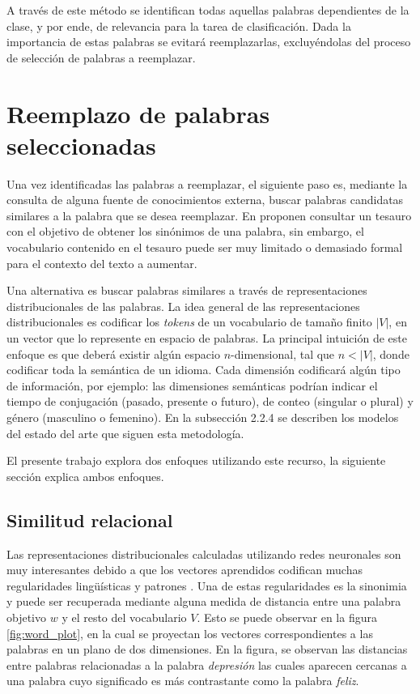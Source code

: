A través de este método se identifican todas aquellas palabras dependientes de la clase, y por ende, de relevancia para la tarea de clasificación. Dada la importancia de estas palabras se evitará reemplazarlas, excluyéndolas del proceso de selección de palabras a reemplazar.

\section{Reemplazo de palabras seleccionadas}

Una vez identificadas las palabras a reemplazar, el siguiente paso es, mediante la consulta de alguna fuente de conocimientos externa, buscar palabras candidatas similares a la palabra que se desea reemplazar. En \citep{zhang2015character} proponen consultar un tesauro con el objetivo de obtener los sinónimos de una palabra, sin embargo, el vocabulario contenido en el tesauro puede ser muy limitado o demasiado formal para el contexto del texto a aumentar. 

Una alternativa es buscar palabras similares a través de representaciones distribucionales de las palabras. La idea general de las representaciones distribucionales es codificar los \textit{tokens} de un vocabulario de tamaño finito $|V|$, en un vector que lo represente en espacio de palabras. La principal intuición de este enfoque es que deberá existir algún espacio $n$-dimensional, tal que $n<|V|$, donde codificar toda la semántica de un idioma. Cada dimensión codificará algún tipo de información, por ejemplo: las dimensiones semánticas podrían indicar el tiempo de conjugación (pasado, presente o futuro), de conteo (singular o plural) y género (masculino o femenino). En la subsección 2.2.4 se describen los modelos del estado del arte que siguen esta metodología.

El presente trabajo explora dos enfoques utilizando este recurso, la siguiente sección explica ambos enfoques.

\subsection{Similitud relacional}

Las representaciones distribucionales calculadas utilizando redes neuronales son muy interesantes debido a que los vectores aprendidos codifican muchas regularidades lingüísticas y patrones \citep{mikolov2013distributed}. Una de estas regularidades es la sinonimia y puede ser recuperada mediante alguna medida de distancia entre una palabra objetivo $w$ y el resto del vocabulario $V$. Esto se puede observar en la figura \ref{fig:word_plot}, en la cual se proyectan los vectores correspondientes a las palabras en un plano de dos dimensiones. En la figura, se observan las distancias entre palabras relacionadas a la palabra \textit{depresión} las cuales aparecen cercanas a una palabra cuyo significado es más contrastante como la palabra \textit{feliz}. 

